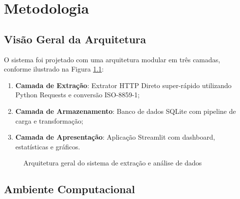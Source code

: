 \documentclass[
    12pt,
    oneside,
    a4paper,
    chapter=TITLE,
    section=TITLE
]{abntex2}
\begin{document}
\chapter{Metodologia}

\section{Visão Geral da Arquitetura}

O sistema foi projetado com uma arquitetura modular em três camadas, conforme ilustrado na Figura \ref{fig:arquitetura}:

\begin{enumerate}
    \item \textbf{Camada de Extração}: Extrator HTTP Direto super-rápido utilizando Python Requests e conversão ISO-8859-1;
    \item \textbf{Camada de Armazenamento}: Banco de dados SQLite com pipeline de carga e transformação;
    \item \textbf{Camada de Apresentação}: Aplicação Streamlit com dashboard, estatísticas e gráficos.
\end{enumerate}

\begin{figure}[H]
\centering
\setlength{\fboxrule}{1pt}
\setlength{\fboxsep}{5pt}
\caption{Arquitetura geral do sistema de extração e análise de dados}
\label{fig:arquitetura}
\end{figure}

\section{Ambiente Computacional}
\end{document}
